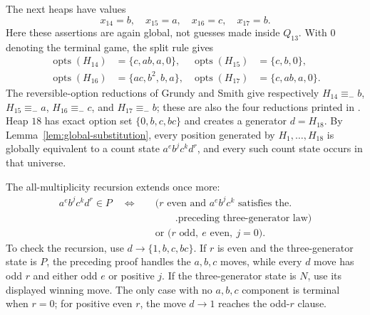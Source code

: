 \documentclass[11pt]{article}
\theoremstyle{definition}
\theoremstyle{remark}
\newcommand{\opts}{\operatorname{opts}}
\begin{document}
The next heaps have values
\[
 x_{14}=b,\quad x_{15}=a,\quad x_{16}=c,\quad x_{17}=b.
\]
Here these assertions are again global, not guesses made inside $Q_{13}$.
With $0$ denoting the terminal game, the split rule gives
\begin{align*}
 \opts(H_{14})&=\{c,ab,a,0\},&
 \opts(H_{15})&=\{c,b,0\},\\
 \opts(H_{16})&=\{ac,b^2,b,a\},&
 \opts(H_{17})&=\{c,ab,a,0\}.
\end{align*}
The reversible-option reductions of Grundy and Smith give respectively
$H_{14}\equiv_-b$, $H_{15}\equiv_-a$, $H_{16}\equiv_-c$, and
$H_{17}\equiv_-b$; these are also the four reductions printed in
\cite[p.~421]{berlekampconwayguy2001}.  Heap $18$ has exact option set
$\{0,b,c,bc\}$ and creates a generator $d=H_{18}$.  By
Lemma~\ref{lem:global-substitution}, every position generated by
$H_1,\ldots,H_{18}$ is globally equivalent to a count state
$a^e b^j c^k d^r$, and every such count state occurs in that universe.

The all-multiplicity recursion extends once more:
\begin{equation}
 \begin{aligned}
 a^e b^j c^k d^r\in P
 \quad\Longleftrightarrow\quad
 &\bigl(r\text{ even and }a^e b^j c^k\text{ satisfies the}\bigr.\\
 &\qquad\bigl.\text{preceding three-generator law}\bigr)\\
 &\text{or }\bigl(r\text{ odd},\ e\text{ even},\ j=0\bigr).
 \end{aligned}
\end{equation}
To check the recursion, use $d\to\{1,b,c,bc\}$.  If $r$ is even and the
three-generator state is $P$, the preceding proof handles the $a,b,c$
moves, while every $d$ move has odd $r$ and either odd $e$ or positive
$j$.  If the three-generator state is $N$, use its displayed winning move.
The only case with no $a,b,c$ component is terminal when $r=0$; for positive
even $r$, the move $d\to1$ reaches the odd-$r$ clause.
\end{document}
